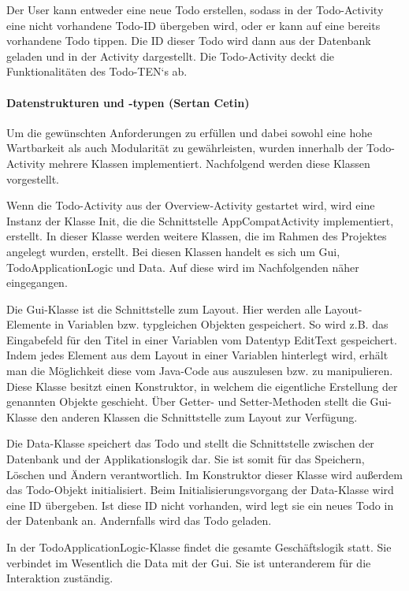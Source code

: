 Der User kann entweder eine neue Todo erstellen, sodass in der Todo-Activity eine nicht vorhandene Todo-ID übergeben wird, oder er kann auf eine bereits vorhandene Todo tippen. Die ID dieser Todo wird dann aus der Datenbank geladen und in der Activity dargestellt. Die Todo-Activity deckt die Funktionalitäten des Todo-TEN‘s ab.

\paragraph{Datenstrukturen und -typen (Sertan Cetin)}
Um die gewünschten Anforderungen zu erfüllen und dabei sowohl eine hohe Wartbarkeit als auch Modularität zu gewährleisten, wurden innerhalb der Todo-Activity mehrere Klassen implementiert. Nachfolgend werden diese Klassen vorgestellt.

Wenn die Todo-Activity aus der Overview-Activity gestartet wird, wird eine Instanz der Klasse Init, die die Schnittstelle AppCompatActivity implementiert, erstellt. In dieser Klasse werden weitere Klassen, die im Rahmen des Projektes angelegt wurden, erstellt. Bei diesen Klassen handelt es sich um Gui, TodoApplicationLogic und Data. Auf diese wird im Nachfolgenden näher eingegangen.

Die Gui-Klasse ist die Schnittstelle zum Layout. Hier werden alle Layout-Elemente in Variablen bzw. typgleichen Objekten gespeichert. So wird z.B. das Eingabefeld für den Titel in einer Variablen vom Datentyp EditText gespeichert. Indem jedes Element aus dem Layout in einer Variablen hinterlegt wird, erhält man die Möglichkeit diese vom Java-Code aus auszulesen bzw. zu manipulieren. Diese Klasse besitzt einen Konstruktor, in welchem die eigentliche Erstellung der genannten Objekte geschieht. Über Getter- und Setter-Methoden stellt die Gui-Klasse den anderen Klassen die Schnittstelle zum Layout zur Verfügung.

Die Data-Klasse speichert das Todo und stellt die Schnittstelle zwischen der Datenbank und der Applikationslogik dar. Sie ist somit für das Speichern, Löschen und Ändern verantwortlich. Im Konstruktor dieser Klasse wird außerdem das Todo-Objekt initialisiert. Beim Initialisierungsvorgang der Data-Klasse wird eine ID übergeben. Ist diese ID nicht vorhanden, wird legt sie ein neues Todo in der Datenbank an. Andernfalls wird das Todo geladen.

In der TodoApplicationLogic-Klasse findet die gesamte Geschäftslogik statt. Sie verbindet im Wesentlich die Data mit der Gui. Sie ist unteranderem für die Interaktion zuständig.


